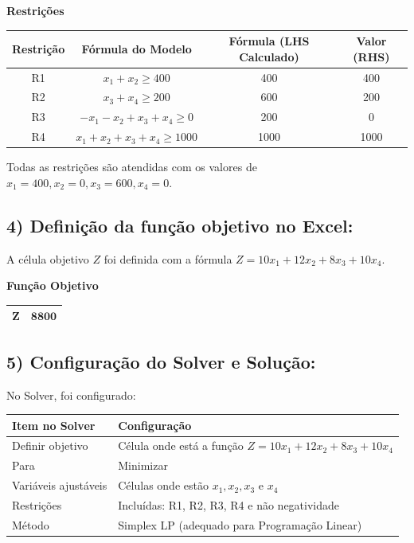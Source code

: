 \documentclass[12pt, a4paper]{article}
\begin{document}
\textbf{Restrições}
\begin{center}
\begin{tabular}{|c|c|c|c|}
\hline
\textbf{Restrição} & \textbf{Fórmula do Modelo} & \textbf{Fórmula (LHS Calculado)} & \textbf{Valor (RHS)} \\
\hline
R1 & $x_1 + x_2 \geq 400$ & 400 & 400 \\
\hline
R2 & $x_3 + x_4 \geq 200$ & 600 & 200 \\
\hline
R3 & $-x_1 - x_2 + x_3 + x_4 \geq 0$ & 200 & 0 \\
\hline
R4 & $x_1 + x_2 + x_3 + x_4 \geq 1000$ & 1000 & 1000 \\
\hline
\end{tabular}
\end{center}
Todas as restrições são atendidas com os valores de $x_1=400, x_2=0, x_3=600, x_4=0$.

\subsection*{4) Definição da função objetivo no Excel:}
A célula objetivo $Z$ foi definida com a fórmula $Z = 10x_1 + 12x_2 + 8x_3 + 10x_4$.

\textbf{Função Objetivo}
\begin{center}
\begin{tabular}{|c|c|}
\hline
$\mathbf{Z}$ & $\mathbf{8800}$ \\
\hline
\end{tabular}
\end{center}

\subsection*{5) Configuração do Solver e Solução:}
No Solver, foi configurado:

\begin{center}
\begin{tabular}{ll}
\toprule
\textbf{Item no Solver} & \textbf{Configuração} \\
\midrule
Definir objetivo & Célula onde está a função $Z = 10x_1 + 12x_2 + 8x_3 + 10x_4$ \\
Para & Minimizar \\
Variáveis ajustáveis & Células onde estão $x_1, x_2, x_3$ e $x_4$ \\
Restrições & Incluídas: R1, R2, R3, R4 e não negatividade \\
Método & Simplex LP (adequado para Programação Linear) \\
\bottomrule
\end{tabular}
\end{center}
\end{document}
